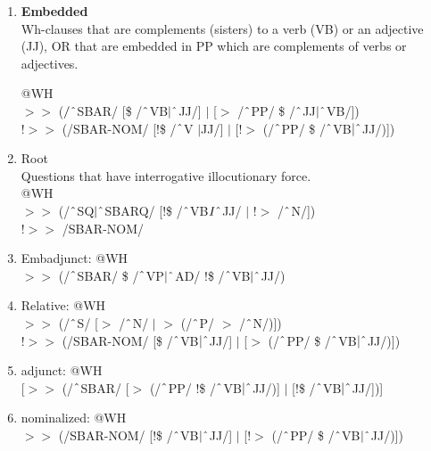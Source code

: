 \begin{enumerate}
        \begin{enumerate}
            \item \textbf{Embedded}\\ 
            Wh-clauses that are complements (sisters) to a verb (VB) or an adjective (JJ), OR that are embedded in PP which are complements of verbs or adjectives.

            @WH \\
            $>\!\!>$ ($/\string^$SBAR/ [\$ /$\string^$VB$|\string^$JJ/] $|$ [$>$ /$\string^$PP/ \$ /$\string^$JJ$|\string^$VB/]) \\
            !$>\!\!>$ (/SBAR-NOM/ [!\$ /$\string^$V $|$JJ/] $|$ [!$>$ (/$\string^$PP/ \$ /$\string^$VB$|\string^$JJ/)])

            \item Root\\
            Questions that have interrogative illocutionary force.\\
            @WH \\
            $>\!\!>$ (/$\string^$SQ$|\string^$SBARQ/ [!\$ /$\string^$VB$I\string^$JJ/ $|$ !$>$ /$\string^$N/]) \\
            !$>\!\!>$ /SBAR-NOM/

            \item Embadjunct: @WH\\ 
            $>\!\!>$ (/$\string^$SBAR/ \$ /$\string^$VP$|\string^$AD/ !\$ /$\string^$VB$|\string^$JJ/)
            
            \item Relative: @WH \\
            $>\!\!>$ (/$\string^$S/ [$>$ /$\string^$N/ $|$ $>$ (/$\string^$P/ $>$ /$\string^$N/)]) \\
            !$>\!\!>$ (/SBAR-NOM/ [\$ /$\string^$VB$|\string^$JJ/] $|$ [$>$ (/$\string^$PP/ \$ /$\string^$VB$|\string^$JJ/)])



            \item adjunct: @WH\\
            {}[$>\!\!>$ (/$\string^$SBAR/ [$>$ (/$\string^$PP/ !\$ /$\string^$VB$|\string^$JJ/)] $|$ [!\$ /$\string^$VB$|\string^$JJ/])]

            \item nominalized: @WH \\
            $>\!\!>$ (/SBAR-NOM/ [!\$ /$\string^$VB$|\string^$JJ/] $|$ [!$>$ (/$\string^$PP/ \$ /$\string^$VB$|\string^$JJ/)])


\end{enumerate}
\end{enumerate}
